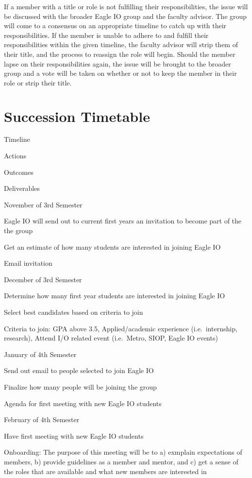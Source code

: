 \documentclass[
]{book}
\begin{document}
If a member with a title or role is not fulfilling their responsibilities, the issue will be discussed with the broader Eagle IO group and the faculty advisor. The group will come to a consensus on an appropriate timeline to catch up with their responsibilities. If the member is unable to adhere to and fulfill their responsibilities within the given timeline, the faculty advisor will strip them of their title, and the process to reassign the role will begin. Should the member lapse on their responsibilities again, the issue will be brought to the broader group and a vote will be taken on whether or not to keep the member in their role or strip their title.

\hypertarget{timetable}{%
\section{Succession Timetable}\label{timetable}}

Timeline

Actions

Outcomes

Deliverables

November of 3rd Semester

Eagle IO will send out to current first years an invitation to become part of the the group

Get an estimate of how many students are interested in joining Eagle IO

Email invitation

December of 3rd Semester

Determine how many first year students are interested in joining Eagle IO

Select best candidates based on criteria to join

Criteria to join: GPA above 3.5, Applied/academic experience (i.e.~internship, research), Attend I/O related event (i.e.~Metro, SIOP, Eagle IO events)

January of 4th Semester

Send out email to people selected to join Eagle IO

Finalize how many people will be joining the group

Agenda for first meeting with new Eagle IO students

February of 4th Semester

Have first meeting with new Eagle IO students

Onboarding: The purpose of this meeting will be to a) exmplain expectations of members, b) provide guidelines as a member and mentor, and c) get a sense of the roles that are available and what new members are interested in
\end{document}
